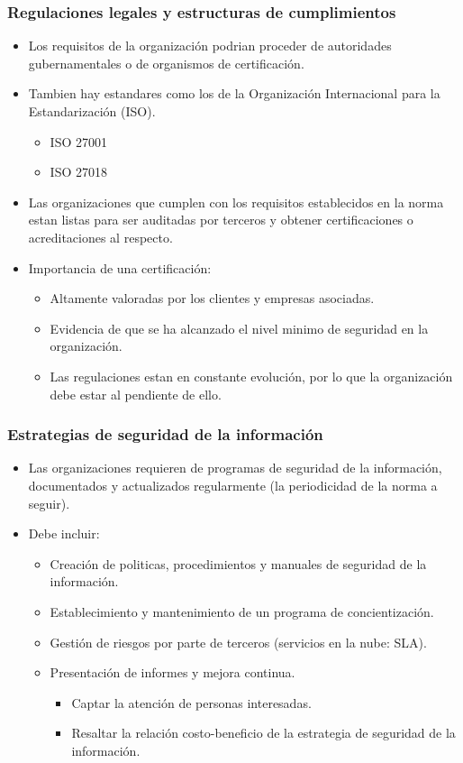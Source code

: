 \documentclass[11pt]{article}
\begin{document}
\subsubsection{Regulaciones legales y estructuras de cumplimientos}
\label{sec:orgf1e2a31}
\begin{itemize}
\item Los requisitos de la organización podrian proceder de autoridades gubernamentales o de organismos de certificación.
\item Tambien hay estandares como los de la Organización Internacional para la Estandarización (ISO).
\begin{itemize}
\item ISO 27001
\item ISO 27018
\end{itemize}
\item Las organizaciones que cumplen con los requisitos establecidos en la norma estan listas para ser auditadas por terceros y obtener certificaciones o acreditaciones al respecto.
\item Importancia de una certificación:
\begin{itemize}
\item Altamente valoradas por los clientes y empresas asociadas.
\item Evidencia de que se ha alcanzado el nivel minimo de seguridad en la organización.
\item Las regulaciones estan en constante evolución, por lo que la organización debe estar al pendiente de ello.
\end{itemize}
\end{itemize}
\subsubsection{Estrategias de seguridad de la información}
\label{sec:orgf875491}
\begin{itemize}
\item Las organizaciones requieren de programas de seguridad de la información, documentados y actualizados regularmente (la periodicidad de la norma a seguir).
\item Debe incluir:
\begin{itemize}
\item Creación de politicas, procedimientos y manuales de seguridad de la información.
\item Establecimiento y mantenimiento de un programa de concientización.
\item Gestión de riesgos por parte de terceros (servicios en la nube: SLA).
\item Presentación de informes y mejora continua.
\begin{itemize}
\item Captar la atención de personas interesadas.
\item Resaltar la relación costo-beneficio de la estrategia de seguridad de la información.
\end{itemize}
\end{itemize}
\end{itemize}
\end{document}
